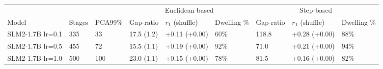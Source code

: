 \begin{tabular}{lllllllll}
\toprule
 &  &  & \multicolumn{3}{c}{Euclidean-based} & \multicolumn{3}{c}{Step-based} \\
\cmidrule(lr){4-6} \cmidrule(lr){7-9}
Model & {\small Stages} & {\footnotesize PCA99\%} & Gap-ratio & $r_1$ {\small (shuffle)} & Dwelling \% & Gap-ratio & $r_1$ {\small (shuffle)} & Dwelling \% \\
\midrule
{\scriptsize SLM2-1.7B lr=0.1} & 335 & 33 & 17.5 {\small (1.2)} & +0.11 {\small (+0.00)} & 60\% & 118.8 & +0.28 {\small (+0.00)} & 88\% \\
{\scriptsize SLM2-1.7B lr=0.5} & 455 & 72 & 15.5 {\small (1.1)} & +0.19 {\small (+0.00)} & 92\% & 71.0 & +0.21 {\small (+0.00)} & 94\% \\
{\scriptsize SLM2-1.7B lr=1.0} & 500 & 100 & 23.0 {\small (1.1)} & +0.15 {\small (+0.00)} & 78\% & 81.5 & +0.16 {\small (+0.00)} & 82\% \\
\bottomrule
\end{tabular}
